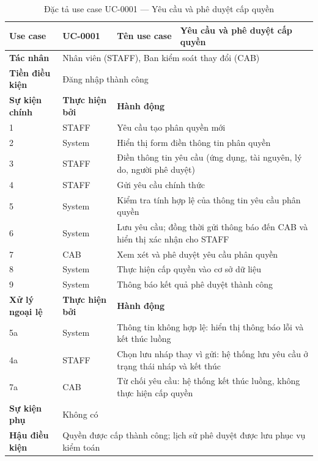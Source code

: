 \documentclass[../DoAn.tex]{subfiles}
\begin{document}
\begin{table}[H]
\centering
\caption{Đặc tả use case UC-0001 — Yêu cầu và phê duyệt cấp quyền}
\label{tab:uc-0001}
\renewcommand{\arraystretch}{1.3}
\begin{tabular}{|p{3.0cm}|p{2.3cm}|p{2.7cm}|p{4.5cm}|}
\hline
\textbf{Use case} & UC-0001 & \textbf{Tên use case} & Yêu cầu và phê duyệt cấp quyền \\
\hline
\textbf{Tác nhân} & \multicolumn{3}{p{9.5cm}|}{Nhân viên (STAFF), Ban kiểm soát thay đổi (CAB)} \\
\hline
\textbf{Tiền điều kiện} & \multicolumn{3}{p{9.5cm}|}{Đăng nhập thành công} \\
\hline
\textbf{Sự kiện chính} & \textbf{Thực hiện bởi} & \multicolumn{2}{p{7.2cm}|}{\textbf{Hành động}} \\
\hline
1 & STAFF & \multicolumn{2}{p{7.2cm}|}{Yêu cầu tạo phân quyền mới} \\
\hline
2 & System & \multicolumn{2}{p{7.2cm}|}{Hiển thị form điền thông tin phân quyền} \\
\hline
3 & STAFF & \multicolumn{2}{p{7.2cm}|}{Điền thông tin yêu cầu (ứng dụng, tài nguyên, lý do, người phê duyệt)} \\
\hline
4 & STAFF & \multicolumn{2}{p{7.2cm}|}{Gửi yêu cầu chính thức} \\
\hline
5 & System & \multicolumn{2}{p{7.2cm}|}{Kiểm tra tính hợp lệ của thông tin yêu cầu phân quyền} \\
\hline
6 & System & \multicolumn{2}{p{7.2cm}|}{Lưu yêu cầu; đồng thời gửi thông báo đến CAB và hiển thị xác nhận cho STAFF} \\
\hline
7 & CAB & \multicolumn{2}{p{7.2cm}|}{Xem xét và phê duyệt yêu cầu phân quyền} \\
\hline
8 & System & \multicolumn{2}{p{7.2cm}|}{Thực hiện cấp quyền vào cơ sở dữ liệu} \\
\hline
9 & System & \multicolumn{2}{p{7.2cm}|}{Thông báo kết quả phê duyệt thành công} \\
\hline
\textbf{Xử lý ngoại lệ} & \textbf{Thực hiện bởi} & \multicolumn{2}{p{7.2cm}|}{\textbf{Hành động}} \\
\hline
5a & System & \multicolumn{2}{p{7.2cm}|}{Thông tin không hợp lệ: hiển thị thông báo lỗi và kết thúc luồng} \\
\hline
4a & STAFF & \multicolumn{2}{p{7.2cm}|}{Chọn lưu nháp thay vì gửi: hệ thống lưu yêu cầu ở trạng thái nháp và kết thúc} \\
\hline
7a & CAB & \multicolumn{2}{p{7.2cm}|}{Từ chối yêu cầu: hệ thống kết thúc luồng, không thực hiện cấp quyền} \\
\hline
\textbf{Sự kiện phụ} & \multicolumn{3}{p{9.5cm}|}{Không có} \\
\hline
\textbf{Hậu điều kiện} & \multicolumn{3}{p{9.5cm}|}{Quyền được cấp thành công; lịch sử phê duyệt được lưu phục vụ kiểm toán} \\
\hline
\end{tabular}
\end{table}
\end{document}
